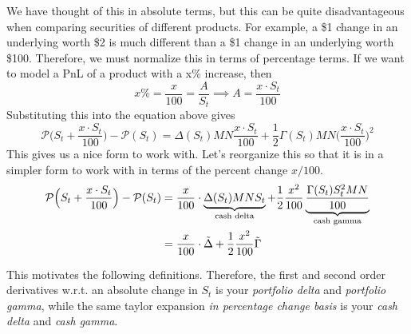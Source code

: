 \documentclass{article}
\begin{document}
    We have thought of this in absolute terms, but this can be quite disadvantageous when comparing securities of different products. For example, a \$1 change in an underlying worth \$2 is much different than a \$1 change in an underlying worth \$100. Therefore, we must normalize this in terms of percentage terms. If we want to model a PnL of a product with a x\% increase, then
    \begin{equation}
      x\% = \frac{x}{100} = \frac{A}{S_t} \implies A = \frac{x \cdot S_t}{100}
    \end{equation}
    Substituting this into the equation above gives
    \begin{equation}
      \mathcal{P}\Big(S_t + \frac{x \cdot S_t}{100} \Big) - \mathcal{P} (S_t) = \Delta (S_t) M N \frac{x \cdot S_t}{100} + \frac{1}{2} \Gamma (S_t) M N \bigg( \frac{x \cdot S_t}{100} \bigg)^2
    \end{equation}
    This gives us a nice form to work with. Let's reorganize this so that it is in a simpler form to work with in terms of the percent change $x/100$.
    \begin{align}
      \mathcal{P}\Big(S_t + \frac{x \cdot S_t}{100} \Big) - \mathcal{P} (S_t) & = \frac{x}{100} \cdot \underbrace{\Delta (S_t) M N S_t}_{\text{cash delta}} + \frac{1}{2} \frac{x^2}{100} \underbrace{\frac{\Gamma (S_t) S_t^2 M N}{100}}_{\text{cash gamma}}  \\
      & = \frac{x}{100} \cdot \Tilde{\Delta} + \frac{1}{2} \frac{x^2}{100} \Tilde{\Gamma}
    \end{align}

    This motivates the following definitions. Therefore, the first and second order derivatives w.r.t. an absolute change in $S_t$ is your \textit{portfolio delta} and \textit{portfolio gamma}, while the same taylor expansion \textit{in percentage change basis} is your \textit{cash delta} and \textit{cash gamma}.
\end{document}
